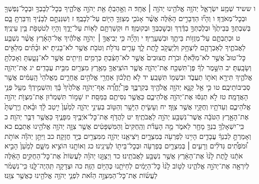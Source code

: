 \documentclass[twoside, openany, parskip=half, 11pt]{book}
\begin{document}
ו ששיד שְׁמַ֖ע יִשְׂרָאֵ֑ל יְהֹוָ֥ה אֱלֹהֵ֖ינוּ יְהֹוָ֥ה ׀ אֶחָֽד׃ ה וְאָ֣הַבְתָּ֔ אֵ֖ת יְהֹוָ֣ה אֱלֹהֶ֑יךָ בְּכׇל־לְבָבְךָ֥ וּבְכׇל־נַפְשְׁךָ֖ וּבְכׇל־מְאֹדֶֽךָ׃ ו וְהָי֞וּ הַדְּבָרִ֣ים הָאֵ֗לֶּה אֲשֶׁ֨ר אָנֹכִ֧י מְצַוְּךָ֛ הַיּ֖וֹם עַל־לְבָבֶֽךָ׃ ז וְשִׁנַּנְתָּ֣ם לְבָנֶ֔יךָ וְדִבַּרְתָּ֖ בָּ֑ם בְּשִׁבְתְּךָ֤ בְּבֵיתֶ֙ךָ֙ וּבְלֶכְתְּךָ֣ בַדֶּ֔רֶךְ וּֽבְשׇׁכְבְּךָ֖ וּבְקוּמֶֽךָ׃ ח וּקְשַׁרְתָּ֥ם לְא֖וֹת עַל־יָדֶ֑ךָ וְהָי֥וּ לְטֹטָפֹ֖ת בֵּ֥ין עֵינֶֽיךָ׃ ט וּכְתַבְתָּ֛ם עַל־מְזֻז֥וֹת בֵּיתֶ֖ךָ וּבִשְׁעָרֶֽיךָ׃
י וְהָיָ֞ה כִּ֥י יְבִיאֲךָ֣ ׀ יְהֹוָ֣ה אֱלֹהֶ֗יךָ אֶל־הָאָ֜רֶץ אֲשֶׁ֨ר נִשְׁבַּ֧ע לַאֲבֹתֶ֛יךָ לְאַבְרָהָ֛ם לְיִצְחָ֥ק וּֽלְיַעֲקֹ֖ב לָ֣תֶת לָ֑ךְ עָרִ֛ים גְּדֹלֹ֥ת וְטֹבֹ֖ת אֲשֶׁ֥ר לֹא־בָנִֽיתָ׃ יא וּבָ֨תִּ֜ים מְלֵאִ֣ים כׇּל־טוּב֮ אֲשֶׁ֣ר לֹא־מִלֵּ֒אתָ֒ וּבֹרֹ֤ת חֲצוּבִים֙ אֲשֶׁ֣ר לֹא־חָצַ֔בְתָּ כְּרָמִ֥ים וְזֵיתִ֖ים אֲשֶׁ֣ר לֹא־נָטָ֑עְתָּ וְאָכַלְתָּ֖ וְשָׂבָֽעְתָּ׃ יב הִשָּׁ֣מֶר לְךָ֔ פֶּן־תִּשְׁכַּ֖ח אֶת־יְהֹוָ֑ה אֲשֶׁ֧ר הוֹצִֽיאֲךָ֛ מֵאֶ֥רֶץ מִצְרַ֖יִם מִבֵּ֥ית עֲבָדִֽים׃ יג אֶת־יְהֹוָ֧ה אֱלֹהֶ֛יךָ תִּירָ֖א וְאֹת֣וֹ תַעֲבֹ֑ד וּבִשְׁמ֖וֹ תִּשָּׁבֵֽעַ׃ יד לֹ֣א תֵֽלְכ֔וּן אַחֲרֵ֖י אֱלֹהִ֣ים אֲחֵרִ֑ים מֵאֱלֹהֵי֙ הָֽעַמִּ֔ים אֲשֶׁ֖ר סְבִיבוֹתֵיכֶֽם׃ טו כִּ֣י אֵ֥ל קַנָּ֛א יְהֹוָ֥ה אֱלֹהֶ֖יךָ בְּקִרְבֶּ֑ךָ פֶּן־יֶ֠חֱרֶ֠ה אַף־יְהֹוָ֤ה אֱלֹהֶ֙יךָ֙ בָּ֔ךְ וְהִשְׁמִ֣ידְךָ֔ מֵעַ֖ל פְּנֵ֥י הָאֲדָמָֽה׃
טז לֹ֣א תְנַסּ֔וּ אֶת־יְהֹוָ֖ה אֱלֹהֵיכֶ֑ם כַּאֲשֶׁ֥ר נִסִּיתֶ֖ם בַּמַּסָּֽה׃ יז שָׁמ֣וֹר תִּשְׁמְר֔וּן אֶת־מִצְוֺ֖ת יְהֹוָ֣ה אֱלֹהֵיכֶ֑ם וְעֵדֹתָ֥יו וְחֻקָּ֖יו אֲשֶׁ֥ר צִוָּֽךְ׃ יח וְעָשִׂ֛יתָ הַיָּשָׁ֥ר וְהַטּ֖וֹב בְּעֵינֵ֣י יְהֹוָ֑ה לְמַ֙עַן֙ יִ֣יטַב לָ֔ךְ וּבָ֗אתָ וְיָֽרַשְׁתָּ֙ אֶת־הָאָ֣רֶץ הַטֹּבָ֔ה אֲשֶׁר־נִשְׁבַּ֥ע יְהֹוָ֖ה לַאֲבֹתֶֽיךָ׃ יט לַהֲדֹ֥ף אֶת־כׇּל־אֹיְבֶ֖יךָ מִפָּנֶ֑יךָ כַּאֲשֶׁ֖ר דִּבֶּ֥ר יְהֹוָֽה׃
כ כִּֽי־יִשְׁאָלְךָ֥ בִנְךָ֛ מָחָ֖ר לֵאמֹ֑ר מָ֣ה הָעֵדֹ֗ת וְהַֽחֻקִּים֙ וְהַמִּשְׁפָּטִ֔ים אֲשֶׁ֥ר צִוָּ֛ה יְהֹוָ֥ה אֱלֹהֵ֖ינוּ אֶתְכֶֽם׃ כא וְאָמַרְתָּ֣ לְבִנְךָ֔ עֲבָדִ֛ים הָיִ֥ינוּ לְפַרְעֹ֖ה בְּמִצְרָ֑יִם וַיֹּצִיאֵ֧נוּ יְהֹוָ֛ה מִמִּצְרַ֖יִם בְּיָ֥ד חֲזָקָֽה׃ כב וַיִּתֵּ֣ן יְהֹוָ֡ה אוֹתֹ֣ת וּ֠מֹפְתִ֠ים גְּדֹלִ֨ים וְרָעִ֧ים ׀ בְּמִצְרַ֛יִם בְּפַרְעֹ֥ה וּבְכׇל־בֵּית֖וֹ לְעֵינֵֽינוּ׃ כג וְאוֹתָ֖נוּ הוֹצִ֣יא מִשָּׁ֑ם לְמַ֙עַן֙ הָבִ֣יא אֹתָ֔נוּ לָ֤תֶת לָ֙נוּ֙ אֶת־הָאָ֔רֶץ אֲשֶׁ֥ר נִשְׁבַּ֖ע לַאֲבֹתֵֽינוּ׃ כד וַיְצַוֵּ֣נוּ יְהֹוָ֗ה לַעֲשׂוֹת֙ אֶת־כׇּל־הַחֻקִּ֣ים הָאֵ֔לֶּה לְיִרְאָ֖ה אֶת־יְהֹוָ֣ה אֱלֹהֵ֑ינוּ לְט֥וֹב לָ֙נוּ֙ כׇּל־הַיָּמִ֔ים לְחַיֹּתֵ֖נוּ כְּהַיּ֥וֹם הַזֶּֽה׃ כה וּצְדָקָ֖ה תִּֽהְיֶה־לָּ֑נוּ כִּֽי־נִשְׁמֹ֨ר לַעֲשׂ֜וֹת אֶת־כׇּל־הַמִּצְוָ֣ה הַזֹּ֗את לִפְנֵ֛י יְהֹוָ֥ה אֱלֹהֵ֖ינוּ כַּאֲשֶׁ֥ר צִוָּֽנוּ׃
\end{document}
